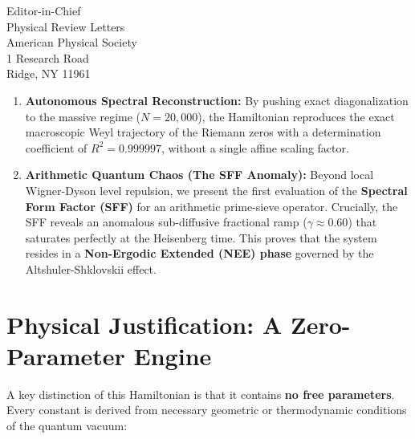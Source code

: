 \documentclass[11pt,a4paper]{letter}
\begin{document}
\begin{letter}{
    Editor-in-Chief\\
    Physical Review Letters\\
    American Physical Society\\
    1 Research Road\\
    Ridge, NY 11961
}
\begin{enumerate}
    \item \textbf{Autonomous Spectral Reconstruction:} By pushing exact diagonalization to the massive regime ($N=20,000$), the Hamiltonian reproduces the exact macroscopic Weyl trajectory of the Riemann zeros with a determination coefficient of \textbf{$R^2 = 0.999997$}, without a single affine scaling factor.
    \item \textbf{Arithmetic Quantum Chaos (The SFF Anomaly):} Beyond local Wigner-Dyson level repulsion, we present the first evaluation of the \textbf{Spectral Form Factor (SFF)} for an arithmetic prime-sieve operator. Crucially, the SFF reveals an anomalous sub-diffusive fractional ramp ($\gamma \approx 0.60$) that saturates perfectly at the Heisenberg time. This proves that the system resides in a \textbf{Non-Ergodic Extended (NEE) phase} governed by the Altshuler-Shklovskii effect.
\end{enumerate}

\section*{Physical Justification: A Zero-Parameter Engine}

A key distinction of this Hamiltonian is that it contains \textbf{no free parameters}. Every constant is derived from necessary geometric or thermodynamic conditions of the quantum vacuum:


\end{letter}
\end{document}

